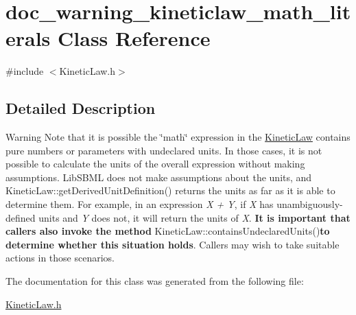 \hypertarget{classdoc__warning__kineticlaw__math__literals}{}\section{doc\+\_\+warning\+\_\+kineticlaw\+\_\+math\+\_\+literals Class Reference}
\label{classdoc__warning__kineticlaw__math__literals}


{\ttfamily \#include $<$Kinetic\+Law.\+h$>$}



\subsection{Detailed Description}
\begin{DoxyWarning}{Warning}
Note that it is possible the \char`\"{}math\char`\"{} expression in the \hyperlink{class_kinetic_law}{Kinetic\+Law} contains pure numbers or parameters with undeclared units. In those cases, it is not possible to calculate the units of the overall expression without making assumptions. Lib\+S\+B\+ML does not make assumptions about the units, and Kinetic\+Law\+::get\+Derived\+Unit\+Definition() returns the units as far as it is able to determine them. For example, in an expression {\itshape X + Y}, if {\itshape X} has unambiguously-\/defined units and {\itshape Y} does not, it will return the units of {\itshape X}. {\bfseries It is important that callers also invoke the method} Kinetic\+Law\+::contains\+Undeclared\+Units(){\bfseries to determine whether this situation holds}. Callers may wish to take suitable actions in those scenarios. 
\end{DoxyWarning}


The documentation for this class was generated from the following file\+:\begin{DoxyCompactItemize}
\item 
\hyperlink{_kinetic_law_8h}{Kinetic\+Law.\+h}\end{DoxyCompactItemize}
